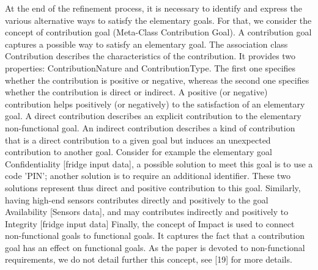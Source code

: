 At the end of the refinement process, it is necessary to identify and express the various alternative ways to satisfy the elementary goals. For that, we consider the concept of contribution goal (Meta-Class Contribution Goal). A contribution goal captures a possible way to satisfy an elementary goal. The association class Contribution describes the characteristics of the contribution. It provides two properties: ContributionNature and ContributionType. The first one specifies whether the contribution is positive or negative, whereas the second one specifies whether the contribution is direct or indirect. 
A positive (or negative) contribution helps positively (or negatively) to the satisfaction of an elementary goal. 
A direct contribution describes an explicit contribution to the elementary non-functional goal. An indirect contribution describes a kind of contribution that is a direct contribution to a given goal but induces an unexpected contribution to another goal.
Consider for example the elementary goal Confidentiality [fridge input data], a possible solution to meet this goal is to use a code 'PIN'; another solution is to require an additional identifier. These two solutions represent thus direct and positive contribution to this goal. Similarly, having high-end sensors contributes directly and positively to the goal Availability [Sensors data], and may contributes indirectly and positively to Integrity [fridge input data]
Finally, the concept of Impact is used to connect non-functional goals to functional goals. It captures the fact that a contribution goal has an effect on functional goals. As the paper is devoted to non-functional requirements, we do not detail further this concept, see [19] for more details.

